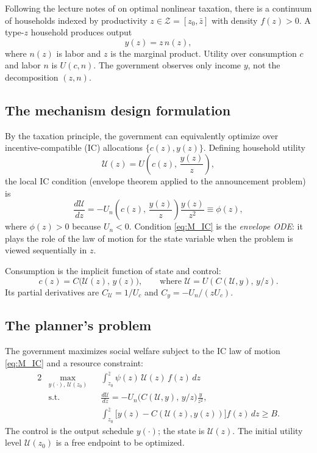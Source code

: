 \documentclass[12pt]{article}
\newcommand{\calU}{\mathcal{U}}
\newcommand{\calZ}{\mathcal{Z}}
\newcommand{\zbar}{\bar{z}}
\newcommand{\zlow}{z_{0}}
\begin{document}
Following the lecture notes of \citet{Bhandari2026} on optimal nonlinear taxation, there is a continuum
of households indexed by productivity $z \in \calZ = [\zlow, \zbar]$ with
density $f(z) > 0$.  A type-$z$ household produces output
\begin{equation}\label{eq:M_output}
  y(z) = z\, n(z),
\end{equation}
where $n(z)$ is labor and $z$ is the marginal product.  Utility over
consumption $c$ and labor $n$ is $U(c, n)$.  The government observes only
income $y$, not the decomposition $(z, n)$.

\subsection{The mechanism design formulation}

By the taxation principle, the government can equivalently optimize over
incentive-compatible (IC) allocations $\{c(z), y(z)\}$.  Defining household
utility
\begin{equation}\label{eq:M_utility}
  \calU(z) = U\!\left(c(z),\, \frac{y(z)}{z}\right),
\end{equation}
the local IC condition (envelope theorem applied to the announcement problem)
is
\begin{equation}\label{eq:M_IC}
  \frac{d\calU}{dz} = -U_n\!\left(c(z),\,\frac{y(z)}{z}\right)\frac{y(z)}{z^2}
  \equiv \phi(z),
\end{equation}
where $\phi(z) > 0$ because $U_n < 0$.  Condition \eqref{eq:M_IC} is the
\emph{envelope ODE}: it plays the role of the law of motion for the state
variable when the problem is viewed sequentially in $z$.

Consumption is the implicit function of state and control:
\begin{equation}\label{eq:M_c}
  c(z) = C\!\bigl(\calU(z),\, y(z)\bigr),
  \qquad
  \text{where } \calU = U(C(\calU, y),\, y/z).
\end{equation}
Its partial derivatives are $C_\calU = 1/U_c$ and $C_y = -U_n/(z U_c)$.

\subsection{The planner's problem}

The government maximizes social welfare subject to the IC law of motion
\eqref{eq:M_IC} and a resource constraint:
\begin{alignat}{2}
  & \max_{y(\cdot),\, \calU(\zlow)} &
  & \int_{\zlow}^{\zbar} \psi(z)\,\calU(z)\,f(z)\,dz
  \label{eq:M_obj} \\
  & \text{s.t.} &
  & \frac{d\calU}{dz} = -U_n\!\bigl(C(\calU,y),\, y/z\bigr)\frac{y}{z^2},
  \label{eq:M_IC2} \\
  & &
  & \int_{\zlow}^{\zbar}\bigl[y(z)-C(\calU(z), y(z))\bigr]f(z)\,dz \ge B.
  \label{eq:M_RC}
\end{alignat}
The control is the output schedule $y(\cdot)$; the state is $\calU(z)$.  The
initial utility level $\calU(\zlow)$ is a free endpoint to be optimized.
\end{document}
